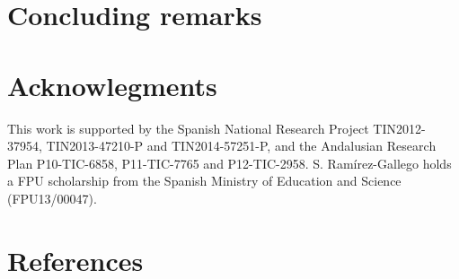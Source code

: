 \documentclass[preprint,12pt]{elsarticle}
\begin{document}

\section{Concluding remarks}
\label{sec:conclusions}

\section*{Acknowlegments}

This work is supported by the Spanish National Research Project TIN2012-37954, TIN2013-47210-P and TIN2014-57251-P, and the Andalusian Research Plan P10-TIC-6858, P11-TIC-7765 and P12-TIC-2958. S. Ram\'irez-Gallego holds a FPU scholarship from the Spanish Ministry of Education and Science (FPU13/00047).

\section*{References}

\end{document}
